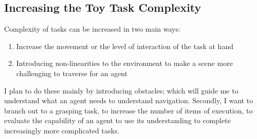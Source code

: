 \subsection{Increasing the Toy Task Complexity}
Complexity of tasks can be increased in two main ways:
\begin{enumerate}
  \item Increase the movement or the level of interaction of the task at hand
  \item Introducing non-linearities to the environment to make a scene more challenging to traverse for an agent
\end{enumerate}
I plan to do these mainly by introducing obstacles; which will guide me to understand what an agent needs to understand navigation. Secondly, I want to branch out to a grasping task, to increase the number of items of execution, to evaluate the capability of an agent to use its understanding to complete increasingly more complicated tasks.

